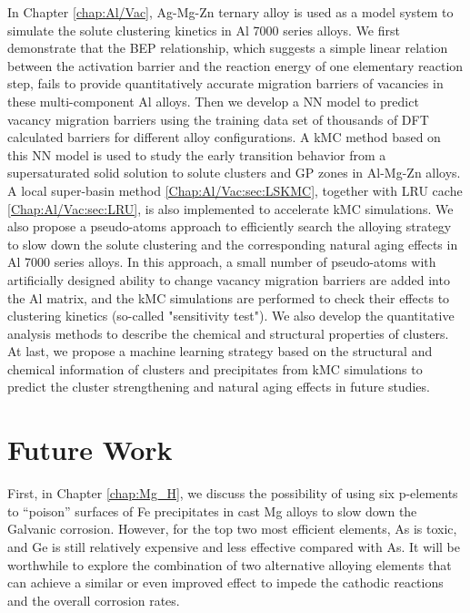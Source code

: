 In Chapter \ref{chap:Al/Vac}, Ag-Mg-Zn ternary alloy is used as a model system to simulate the solute clustering kinetics in Al 7000 series alloys. We first demonstrate that the \acf{BEP} relationship, which suggests a simple linear relation between the activation barrier and the reaction energy of one elementary reaction step, fails to provide quantitatively accurate migration barriers of vacancies in these multi-component Al alloys. Then we develop a \ac{NN} model to predict vacancy migration barriers using the training data set of thousands of \ac{DFT} calculated barriers for different alloy configurations. A \ac{kMC} method based on this \ac{NN} model is used to study the early transition behavior from a supersaturated solid solution to solute clusters and \acf{GP} zones in Al-Mg-Zn alloys. A local super-basin method  \ref{Chap:Al/Vac:sec:LSKMC}, together with \ac{LRU} cache \ref{Chap:Al/Vac:sec:LRU}, is also implemented to accelerate \ac{kMC} simulations. We also propose a pseudo-atoms approach to efficiently search the alloying strategy to slow down the solute clustering and the corresponding natural aging effects in Al 7000 series alloys. In this approach, a small number of pseudo-atoms with artificially designed ability to change vacancy migration barriers are added into the Al matrix, and the \ac{kMC} simulations are performed to check their effects to clustering kinetics (so-called "sensitivity test"). We also develop the quantitative analysis methods to describe the chemical and structural properties of clusters. At last, we propose a machine learning strategy based on the structural and chemical information of clusters and precipitates from \ac{kMC} simulations to predict the cluster strengthening and natural aging effects in future studies.

\section{Future Work}

First, in Chapter \ref{chap:Mg_H}, we discuss the possibility of using six p-elements to ``poison'' surfaces of Fe precipitates in cast Mg alloys to slow down the Galvanic corrosion. However, for the top two most efficient elements, As is toxic, and Ge is still relatively expensive and less effective compared with As. It will be worthwhile to explore the combination of two alternative alloying elements that can achieve a similar or even improved effect to impede the cathodic reactions and the overall corrosion rates.

